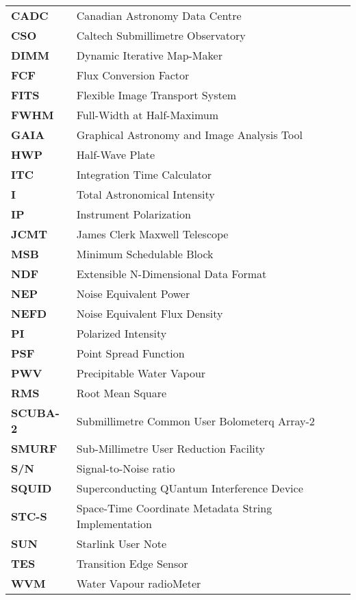 \documentclass[11pt,oneside,chapters]{starlink}
\begin{document}
\scfrontmatter

\newcommand{\xparam}[2]{\hyperref[#1]{\param{#2}}}
\newcommand{\setparam}[3]{\xparam{#1}{#2}\param{~=~#3}}

\newcommand{\jsageneric}{\htmladdnormallink{\file{dimmconfig\_jsa\_generic}}
{https://raw.githubusercontent.com/Starlink/starlink/master/applications/smurf/examples/dimmconfig_jsa_generic.lis}}



\Acronyms

\begin{table}[h!]
\begin{tabular}{ll}
\textbf{CADC}   & Canadian Astronomy Data Centre\\
\textbf{CSO}    & Caltech Submillimetre Observatory\\
\textbf{DIMM}   & Dynamic Iterative Map-Maker\\
\textbf{FCF}    & Flux Conversion Factor\\
\textbf{FITS}   & Flexible Image Transport System\\
\textbf{FWHM}   & Full-Width at Half-Maximum\\
\textbf{GAIA}   & Graphical Astronomy and Image Analysis Tool\\
\textbf{HWP}    & Half-Wave Plate\\
\textbf{ITC}    & Integration Time Calculator\\
\textbf{I}      & Total Astronomical Intensity \\
\textbf{IP}     & Instrument Polarization \\
\textbf{JCMT}   & James Clerk Maxwell Telescope\\
\textbf{MSB}    & Minimum Schedulable Block\\
\textbf{NDF}    & Extensible N-Dimensional Data Format\\
\textbf{NEP}    & Noise Equivalent Power\\
\textbf{NEFD}   & Noise Equivalent Flux Density\\
\textbf{PI}     & Polarized Intensity \\
\textbf{PSF}    & Point Spread Function\\
\textbf{PWV}    & Precipitable Water Vapour\\
\textbf{RMS}    & Root Mean Square\\
\textbf{SCUBA-2}& Submillimetre Common User Bolometerq Array-2\\
\textbf{SMURF}  & Sub-Millimetre User Reduction Facility\\
\textbf{S/N}    & Signal-to-Noise ratio\\
\textbf{SQUID}  & Superconducting QUantum Interference Device\\
\textbf{STC-S}  & Space-Time Coordinate Metadata String Implementation\\
\textbf{SUN}    & Starlink User Note\\
\textbf{TES}    & Transition Edge Sensor\\
\textbf{WVM}    & Water Vapour radioMeter\\
\end{tabular}
\end{table}
\end{document}
